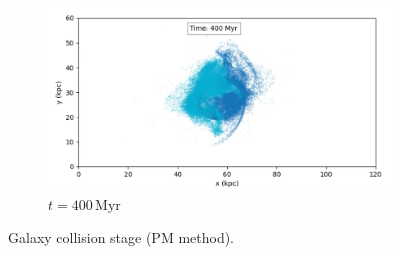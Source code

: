\begin{figure}[htp]
    \begin{subfigure}[b]{0.8\textwidth}
        \centering
        \includegraphics[width=\textwidth]{chapters/results/img/pm-collision/400myr.png}
        \caption{$t=400\,\text{Myr}$}
        \label{fig:collision-pm-sub3}
    \end{subfigure}

    \caption{Galaxy collision stage (PM method).}
    \label{fig:collision-pm}
\end{figure}